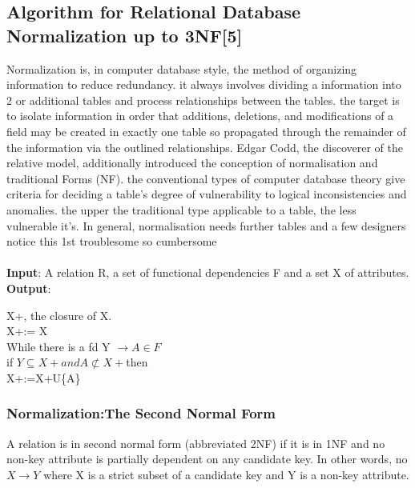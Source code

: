 \documentclass[12pt, a4paper]{article}
\begin{document}
\vspace{5mm}
\subsection{Algorithm for Relational Database Normalization up to 3NF[5]}

\vspace{5mm}
Normalization is, in computer database style, the method of organizing information to reduce redundancy. it always involves dividing a information into 2 or additional tables and process relationships between the tables. the target is to isolate information in order that additions, deletions, and modifications of a field may be created in exactly one table so propagated through the remainder of the information via the outlined relationships. Edgar Codd, the discoverer of the relative model, additionally introduced the conception of normalisation and traditional Forms (NF). the conventional types of computer database theory give criteria for deciding a table's degree of vulnerability to logical inconsistencies and anomalies. the upper the traditional type applicable to a table, the less vulnerable it's. In general, normalisation needs further tables and a few designers notice this 1st troublesome so cumbersome\\
\\
\textbf{Input}:  A relation R, a set of functional dependencies F and a set X of attributes.\\
\textbf{Output}: \begin{center}X+, the closure of X.\\
X+:= X\\
While there is a fd Y \begin{math} \rightarrow  A \in   F \end{math}\\
if \begin{math}Y \subseteq X+	and A \not\subset X+ \end{math}then\\
X+:=X+U\{A\}\\

\end{center}

\subsubsection{Normalization:The Second Normal Form}
A relation is in second normal form (abbreviated 2NF) if it is in 1NF and no non-key attribute is partially dependent on any candidate key. In other words, no \begin{math}X\rightarrow Y\end{math} where X is a strict subset of a candidate key and Y is a non-key attribute.\\\\
\end{document}
